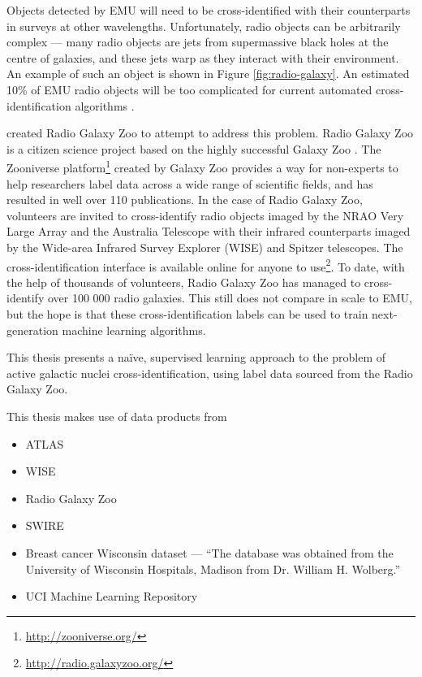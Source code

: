 Objects detected by EMU will need to be cross-identified with their counterparts
in surveys at other wavelengths. Unfortunately, radio objects can be arbitrarily
complex --- many radio objects are jets from supermassive black holes at the
centre of galaxies, and these jets warp as they interact with their environment.
An example of such an object is shown in Figure \ref{fig:radio-galaxy}. An
estimated 10\% of EMU radio objects will be too complicated for current
automated cross-identification algorithms \citep{banfield15, norris11}.

\citet{banfield15} created Radio Galaxy Zoo to attempt to address this
problem. Radio Galaxy Zoo is a citizen science project based on the highly
successful Galaxy Zoo \citep{lintott08, lintott11}. The Zooniverse
platform\footnote{\url{http://zooniverse.org/}} created by Galaxy Zoo provides a
way for non-experts to help researchers label data across a wide range of
scientific fields, and has resulted in well over 110 publications. In the case
of Radio Galaxy Zoo, volunteers are invited to cross-identify radio objects
imaged by the NRAO Very Large Array and the Australia Telescope with their
infrared counterparts imaged by the Wide-area Infrared Survey Explorer (WISE)
and Spitzer telescopes. The cross-identification interface is available online
for anyone to use\footnote{\url{http://radio.galaxyzoo.org/}}. To date, with the
help of thousands of volunteers, Radio Galaxy Zoo has managed to cross-identify
over 100 000 radio galaxies. This still does not compare in scale to EMU, but
the hope is that these cross-identification labels can be used to train
next-generation machine learning algorithms.

This thesis presents a na\"ive, supervised learning approach to the problem of
active galactic nuclei cross-identification, using label data sourced from the
Radio Galaxy Zoo.


This thesis makes use of data products from
\begin{itemize}
    \item ATLAS
    \item WISE
    \item Radio Galaxy Zoo
    \item SWIRE
    \item Breast cancer Wisconsin dataset --- ``The database was obtained from the University of Wisconsin Hospitals, Madison from Dr. William H. Wolberg.''
    \item UCI Machine Learning Repository
\end{itemize}


